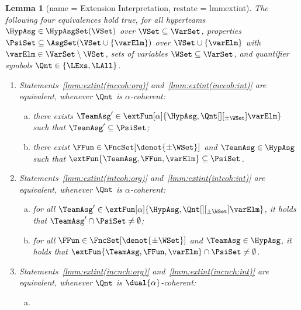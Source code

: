 \documentclass[authoryear]{elsarticle}
\newtheorem{lemma}{Lemma}
\newcommand{\EmpTeamAsg}{\emptyset}
\begin{document}
\begin{lemma}[name = Extension Interpretation, restate = lmmextint]
  \label{lmm:extint}
  The following four equivalences hold true, for all hyperteams $\HypAsg \in
  \HypAsgSet(\VSet)$ over $\VSet \subseteq \VarSet$, properties $\PsiSet
  \subseteq \AsgSet(\VSet \cup \{ \varElm \})$ over $\VSet \cup \{ \varElm \}$
  with $\varElm \in \VarSet \setminus \VSet$, sets of variables $\WSet
  \subseteq \VarSet$, and quantifier symbols $\Qnt \in \{ \LExs, \LAll \}$.
  \begin{enumerate}[1)]
    \item\label{lmm:extint(inccoh)}
      Statements~\ref{lmm:extint(inccoh:org)} and~\ref{lmm:extint(inccoh:int)}
      are equivalent, whenever $\Qnt$ is $\alpha$-coherent:
      \begin{enumerate}[a)]
        \item\label{lmm:extint(inccoh:org)}
          there exists $\TeamAsg' \in \extFun[\alpha]{\HypAsg,
          \Qnt[][_{\pm\WSet}] \varElm}$ such that $\TeamAsg' \subseteq \PsiSet$;
        \item\label{lmm:extint(inccoh:int)}
          there exist $\FFun \in \FncSet[\denot{\pm\WSet}]{}$ and $\TeamAsg \in \HypAsg$
          such that $\extFun{\TeamAsg, \FFun, \varElm} \subseteq \PsiSet$.
      \end{enumerate}
    \item\label{lmm:extint(intcoh)}
      Statements~\ref{lmm:extint(intcoh:org)} and~\ref{lmm:extint(intcoh:int)}
      are equivalent, whenever $\Qnt$ is $\alpha$-coherent:
      \begin{enumerate}[a)]
        \item\label{lmm:extint(intcoh:org)}
          for all $\TeamAsg' \in \extFun[\alpha]{\HypAsg, \Qnt[][_{\pm\WSet}]
          \varElm}$, it holds that $\TeamAsg' \cap \PsiSet \neq \EmpTeamAsg$;
        \item\label{lmm:extint(intcoh:int)}
          for all $\FFun \in \FncSet[\denot{\pm\WSet}]{}$ and $\TeamAsg \in \HypAsg$, it
          holds that $\extFun{\TeamAsg, \FFun, \varElm} \cap \PsiSet \neq
          \EmpTeamAsg$.
      \end{enumerate}
    \item\label{lmm:extint(incnch)}
      Statements~\ref{lmm:extint(incnch:org)} and~\ref{lmm:extint(incnch:int)}
      are equivalent, whenever $\Qnt$ is $\dual{\alpha}$-coherent:
      \begin{enumerate}[a)]
        \item\label{lmm:extint(incnch:org)}

\end{enumerate}
\end{enumerate}
\end{lemma}
\end{document}
